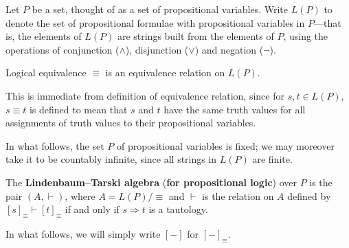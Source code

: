 \begin{definition}
Let $P$ be a set, thought of as a set of propositional variables. Write $L(P)$ to denote the set of propositional formulae with propositional variables in $P$---that is, the elements of $L(P)$ are strings built from the elements of $P$, using the operations of conjunction ($\wedge$), disjunction ($\vee$) and negation ($\neg$).
\end{definition}

\begin{lemma}
Logical equivalence $\equiv$ is an equivalence relation on $L(P)$.
\end{lemma}
\begin{cproof}
This is immediate from definition of equivalence relation, since for $s,t \in L(P)$, $s \equiv t$ is defined to mean that $s$ and $t$ have the same truth values for all assignments of truth values to their propositional variables.
\end{cproof}

In what follows, the set $P$ of propositional variables is fixed; we may moreover take it to be countably infinite, since all strings in $L(P)$ are finite.

\begin{definition}
\label{defLindenbaumTarskiAlgebra}
The \textbf{Lindenbaum--Tarski algebra} (\textbf{for propositional logic}) over $P$ is the pair $(A, \vdash)$, where $A = L(P)/{\equiv}$ and $\vdash$ is the relation on $A$ defined by $[s]_{\equiv} \vdash [t]_{\equiv}$ if and only if $s \Rightarrow t$ is a tautology.
\end{definition}

In what follows, we will simply write $[{-}]$ for $[{-}]_{\equiv}$.


